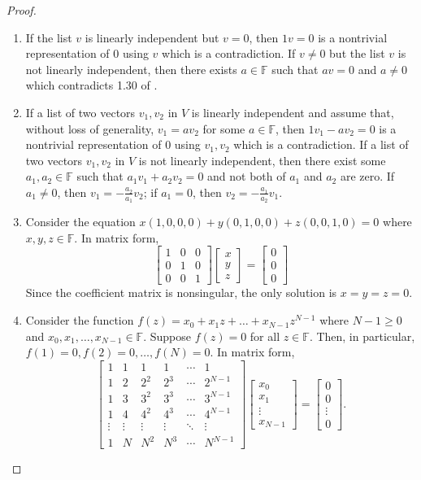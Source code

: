 \begin{proof}
\begin{enumerate}[label=(\alph*)]
\item If the list $v$ is linearly independent but $v=0$, then $1v=0$ is a nontrivial representation of $0$ using $v$ which is a contradiction. If $v\ne 0$ but the list $v$ is not linearly independent, then there exists $a\in\mathbb{F}$ such that $av=0$ and $a\ne 0$ which contradicts 1.30 of \cite{axler2014linear}.
\item If a list of two vectors $v_1,v_2$ in $V$ is linearly independent and assume that, without loss of generality, $v_1=av_2$ for some $a\in\mathbb{F}$, then $1v_1-av_2=0$ is a nontrivial representation of $0$ using $v_1,v_2$ which is a contradiction. If a list of two vectors $v_1,v_2$ in $V$ is not linearly independent, then there exist some $a_1,a_2\in\mathbb{F}$ such that $a_1v_1+a_2v_2=0$ and not both of $a_1$ and $a_2$ are zero. If $a_1\ne 0$, then $v_1=-\frac{a_2}{a_1}v_2$; if $a_1=0$, then $v_2=-\frac{a_1}{a_2}v_1$.
\item Consider the equation $x(1,0,0,0)+y(0,1,0,0)+z(0,0,1,0)=0$ where $x,y,z\in\mathbb{F}$. In matrix form,
\[
\begin{bmatrix}
1&0&0\\
0&1&0\\
0&0&1
\end{bmatrix}
\begin{bmatrix}
x\\
y\\
z
\end{bmatrix}
=
\begin{bmatrix}
0\\
0\\
0
\end{bmatrix}
\]
Since the coefficient matrix is nonsingular, the only solution is $x=y=z=0$.
\item Consider the function $f(z)=x_0+x_1z+\dots+x_{N-1}z^{N-1}$ where $N-1\geq 0$ and $x_0,x_1,\dots,x_{N-1}\in\mathbb{F}$. Suppose $f(z)=0$ for all $z\in\mathbb{F}$. Then, in particular, $f(1)=0, f(2)=0, \dots, f(N)=0$. In matrix form,
\[
\begin{bmatrix}
1&1&1&1&\cdots &1 \\
1&2&2^2&2^3&\cdots&2^{N-1} \\
1&3&3^2&3^3&\cdots&3^{N-1}\\
1&4&4^2&4^3&\cdots&4^{N-1}\\
\vdots&\vdots&\vdots&\vdots&\ddots&\vdots\\
1&N&N^{2}&N^{3}&\cdots&N^{N-1}
\end{bmatrix}
\begin{bmatrix}
x_0\\
x_1\\
\vdots\\
x_{N-1}
\end{bmatrix}
=
\begin{bmatrix}
0\\
0\\
\vdots\\
0
\end{bmatrix}.
\]


\end{enumerate}
\end{proof}
